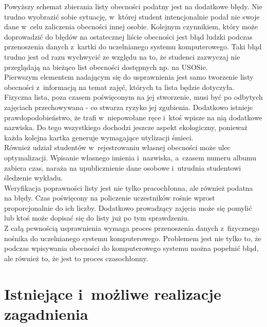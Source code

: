 \documentclass[declaration,shortabstract, mgr]{iithesis}
\begin{document}
\indent Powyższy schemat zbierania listy obecności podatny jest na dodatkowe błędy. Nie trudno wyobrazić sobie sytuację, w~której student intencjonalnie podał nie swoje dane w~celu zaliczenia obecności innej osobie. Kolejnym czynnikiem, który może doprowadzić do błędów na ostatecznej liście obecności jest błąd ludzki podczas przenoszenia danych z~kartki do uczelnianego systemu komputerowego. Taki błąd trudno jest od razu wychwycić ze względu na to, że studenci zazwyczaj nie przeglądają na bieżąco list obecności dostępnych np. na USOSie.\\
\indent Pierwszym elementem nadającym się do usprawnienia jest samo tworzenie listy obecności z~informacją na temat zajęć, których ta lista będzie dotyczyła. Fizyczna lista, poza czasem poświęconym na jej stworzenie, musi być po odbytych zajęciach przechowywana - co stwarza ryzyko jej zgubienia. Dodatkowo istnieje prawdopodobieństwo, że trafi w~niepowołane ręce i~ktoś wpisze na nią dodatkowe nazwiska. Do tego wszystkiego dochodzi jeszcze aspekt ekologiczny, ponieważ każda kolejna kartka generuje wymagające utylizacji śmieci. \\
\indent Również udział studentów w~rejestrowaniu własnej obecności może ulec optymalizacji. Wpisanie własnego imienia i~nazwiska, a~czasem numeru albumu zabiera czas, naraża na upublicznienie dane osobowe i~utrudnia studentowi śledzenie wykładu.\\
\indent Weryfikacja poprawności listy jest nie tylko pracochłonna, ale również podatna na błędy. Czas poświęcony na policzenie uczestników rośnie wprost proporcjonalnie do ich liczby. Dodatkowo prowadzący zajęcia może się pomylić lub ktoś może dopisać się do listy już po tym sprawdzeniu.\\
\indent Z całą pewnością usprawnienia wymaga proces przenoszenia danych z~fizycznego nośnika do uczelnianego systemu komputerowego. Problemem jest nie tylko to, że podczas wpisywania obecności do komputerowego systemu można popełnić błąd, ale również to, że jest to proces czasochłonny.\\

\section{Istniejące i~możliwe realizacje zagadnienia}
\end{document}
